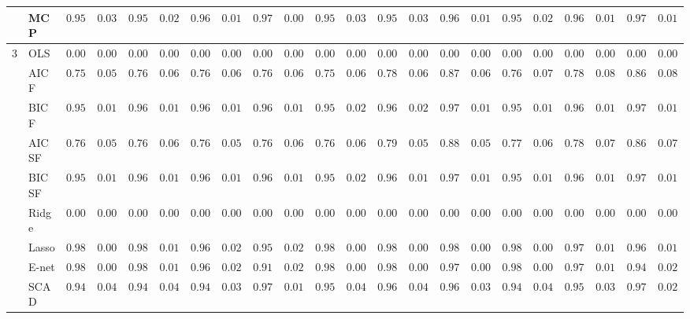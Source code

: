 \begin{tabular}{p{0.2cm}p{1cm}|p{0.6cm}p{0.6cm}|p{0.6cm}p{0.6cm}p{0.6cm}p{0.6cm}p{0.6cm}p{0.6cm}|p{0.6cm}p{0.6cm}p{0.6cm}p{0.6cm}p{0.6cm}p{0.6cm}|p{0.6cm}p{0.6cm}p{0.6cm}p{0.6cm}p{0.6cm}p{0.6cm}}
 & MCP  & $0.9531$ & $0.0346$ & $0.9537$ & $0.0258$ & $0.9669$ & $0.0140$ & $0.9740$ & $0.0088$ & $0.9575$ & $0.0341$ & $0.9552$ & $0.0344$ & $0.9649$ & $0.0189$ & $0.9525$ & $0.0282$ & $0.9631$ & $0.0189$ & $0.9701$ & $0.0122$ \\\hline
3 & OLS  & $0.0000$ & $0.0000$ & $0.0000$ & $0.0000$ & $0.0000$ & $0.0000$ & $0.0000$ & $0.0000$ & $0.0000$ & $0.0000$ & $0.0000$ & $0.0000$ & $0.0000$ & $0.0000$ & $0.0000$ & $0.0000$ & $0.0000$ & $0.0000$ & $0.0000$ & $0.0000$ \\
 & AIC F  & $0.7575$ & $0.0567$ & $0.7624$ & $0.0660$ & $0.7613$ & $0.0603$ & $0.7647$ & $0.0629$ & $0.7569$ & $0.0645$ & $0.7880$ & $0.0625$ & $0.8727$ & $0.0661$ & $0.7687$ & $0.0734$ & $0.7819$ & $0.0801$ & $0.8625$ & $0.0894$ \\
 & BIC F  & $0.9546$ & $0.0198$ & $0.9600$ & $0.0153$ & $0.9631$ & $0.0186$ & $0.9685$ & $0.0172$ & $0.9546$ & $0.0204$ & $0.9613$ & $0.0205$ & $0.9725$ & $0.0150$ & $0.9580$ & $0.0161$ & $0.9641$ & $0.0161$ & $0.9768$ & $0.0112$ \\
 & AIC SF  & $0.7645$ & $0.0532$ & $0.7689$ & $0.0621$ & $0.7652$ & $0.0571$ & $0.7699$ & $0.0616$ & $0.7614$ & $0.0611$ & $0.7937$ & $0.0576$ & $0.8825$ & $0.0585$ & $0.7739$ & $0.0676$ & $0.7868$ & $0.0703$ & $0.8677$ & $0.0796$ \\
 & BIC SF  & $0.9551$ & $0.0193$ & $0.9601$ & $0.0153$ & $0.9634$ & $0.0184$ & $0.9689$ & $0.0168$ & $0.9546$ & $0.0204$ & $0.9615$ & $0.0197$ & $0.9732$ & $0.0137$ & $0.9579$ & $0.0163$ & $0.9640$ & $0.0163$ & $0.9768$ & $0.0112$ \\
 & Ridge  & $0.0000$ & $0.0000$ & $0.0000$ & $0.0000$ & $0.0000$ & $0.0000$ & $0.0000$ & $0.0000$ & $0.0000$ & $0.0000$ & $0.0000$ & $0.0000$ & $0.0000$ & $0.0000$ & $0.0000$ & $0.0000$ & $0.0000$ & $0.0000$ & $0.0000$ & $0.0000$ \\
 & Lasso  & $0.9882$ & $0.0064$ & $0.9849$ & $0.0119$ & $0.9687$ & $0.0246$ & $0.9502$ & $0.0214$ & $0.9884$ & $0.0076$ & $0.9882$ & $0.0043$ & $0.9811$ & $0.0091$ & $0.9867$ & $0.0068$ & $0.9792$ & $0.0136$ & $0.9682$ & $0.0151$ \\
 & E-net  & $0.9878$ & $0.0071$ & $0.9829$ & $0.0149$ & $0.9617$ & $0.0293$ & $0.9177$ & $0.0281$ & $0.9884$ & $0.0076$ & $0.9877$ & $0.0050$ & $0.9766$ & $0.0098$ & $0.9856$ & $0.0094$ & $0.9749$ & $0.0154$ & $0.9492$ & $0.0205$ \\
 & SCAD  & $0.9455$ & $0.0481$ & $0.9402$ & $0.0418$ & $0.9475$ & $0.0313$ & $0.9767$ & $0.0192$ & $0.9547$ & $0.0425$ & $0.9613$ & $0.0403$ & $0.9668$ & $0.0300$ & $0.9435$ & $0.0407$ & $0.9503$ & $0.0306$ & $0.9749$ & $0.0210$ \\

\end{tabular}

